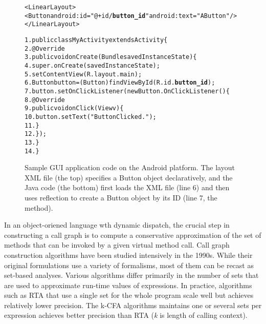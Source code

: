 \begin{figure}[t]
\begin{CodeOut}
\begin{alltt}

<LinearLayout>
    <Button android:id="@+id/\textbf{button\_id}" android:text="A Button" />
</LinearLayout>

1. public class MyActivity extends Activity \{
2.    @Override
3.    public void onCreate(Bundle savedInstanceState) \{
4.        super.onCreate(savedInstanceState);
5.        setContentView(R.layout.main);
6.        Button button = (Button) findViewById(R.id.\textbf{button\_id});
7.        button.setOnClickListener(new Button.OnClickListener() \{
8.            @Override
9.            public void onClick(View v) \{
10.               button.setText("Button Clicked.");
11.           \}
12.       \});
13.   \}
14. \}
\end{alltt}
\end{CodeOut}
\caption{Sample GUI application code on the Android platform. The layout
XML file (the top) specifies a Button object declaratively, 
and the Java code (the bottom)
first loads the XML file (line 6) and then uses reflection to create
a Button object by its ID (line 7, the  method).}
\label{fig:sampleandroid}
\end{figure}

In an object-oriened language wth dynamic dispatch, the
crucial step in constructing a call graph is to compute a conservative
approximation of the set of methods that can be invoked by a given
virtual method call. Call graph construction algorithms have been
studied intensively in the 1990s. While their original formulations
use a variety of formalisms, most of them can be recast as set-based
analyses. Various algorithms differ primarily in the number of sets
that are used to approximate run-time values of expressions. 
In practice, algorithms such as RTA that use a single set for the whole
program scale well but achieves relatively lower precision.  The
k-CFA algorithms maintains one or several sets per expression achieves better
precision than RTA (\textit{k} is length of calling context).


